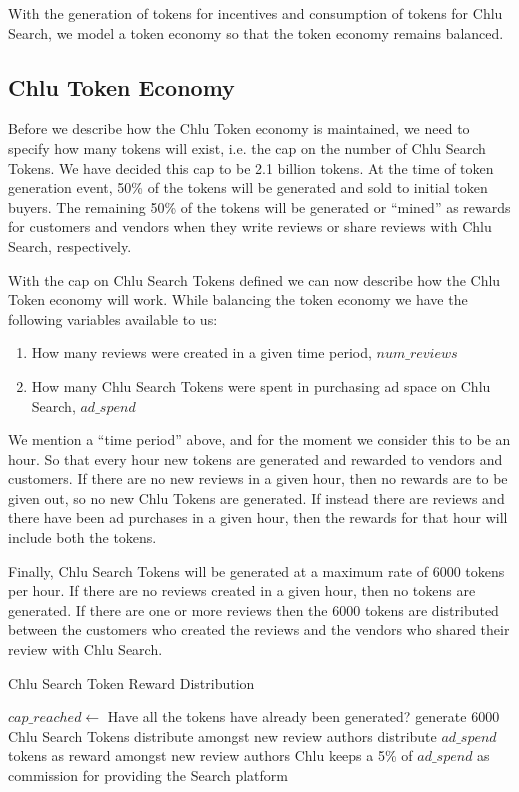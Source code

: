 \documentclass[a4paper]{article}
\begin{document}
With the generation of tokens for incentives and consumption of tokens
for Chlu Search, we model a token economy so that the token economy
remains balanced.

\subsection{Chlu Token Economy}

Before we describe how the Chlu Token economy is maintained, we need
to specify how many tokens will exist, i.e. the cap on the number of
Chlu Search Tokens. We have decided this cap to be 2.1 billion
tokens. At the time of token generation event, 50\% of the tokens will
be generated and sold to initial token buyers. The remaining 50\% of
the tokens will be generated or ``mined'' as rewards for customers and
vendors when they write reviews or share reviews with Chlu Search,
respectively.

With the cap on Chlu Search Tokens defined we can now describe how the
Chlu Token economy will work. While balancing the token economy we
have the following variables available to us:

\begin{enumerate}
\item How many reviews were created in a given time period, $num\_reviews$
\item How many Chlu Search Tokens were spent in purchasing ad space on
  Chlu Search, $ad\_spend$
\end{enumerate}

We mention a ``time period'' above, and for the moment we consider
this to be an hour. So that every hour new tokens are generated and
rewarded to vendors and customers. If there are no new reviews in a
given hour, then no rewards are to be given out, so no new Chlu Tokens
are generated. If instead there are reviews and there have been ad
purchases in a given hour, then the rewards for that hour will include
both the tokens.

Finally, Chlu Search Tokens will be generated at a maximum rate of
$6000$ tokens per hour. If there are no reviews created in a given
hour, then no tokens are generated. If there are one or more reviews
then the $6000$ tokens are distributed between the customers who
created the reviews and the vendors who shared their review with Chlu
Search.

\begin{algorithm}
  \caption{Chlu Search Token Reward Distribution}
  \label{reward-algo}
  \begin{algorithmic}
    \STATE $cap\_reached \leftarrow$ Have all the tokens have already been generated?
    \STATE generate $6000$ Chlu Search Tokens
    \STATE distribute amongst new review authors
    \STATE distribute $ad\_spend$ tokens as reward amongst new review authors
    \STATE Chlu keeps a 5\% of $ad\_spend$ as  commission for providing the Search platform
    \ENDIF
  \end{algorithmic}    
\end{algorithm}
\end{document}
